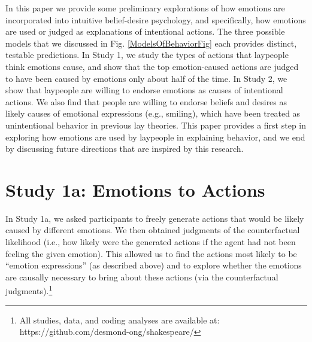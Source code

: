 \documentclass[10pt,letterpaper]{article}
\newcommand{\ndg}[1]{\textcolor{Green}{[ndg: #1]}}
\begin{document}




In this paper we provide some preliminary explorations of how emotions are incorporated into intuitive belief-desire psychology, and specifically, how emotions are used or judged as explanations of intentional actions. The three possible models that we discussed in Fig. \ref{ModelsOfBehaviorFig} each provides distinct, testable predictions. In Study 1, we study the types of actions that laypeople think emotions cause, and show that the top emotion-caused actions are judged to have been caused by emotions only about half of the time. In Study 2, we show that laypeople are willing to endorse emotions as causes of intentional actions. We also find that people are willing to endorse beliefs and desires as likely causes of emotional expressions (e.g., smiling), which have been treated as unintentional behavior in previous lay theories. This paper provides a first step in exploring how emotions are used by laypeople in explaining behavior, and we end by discussing future directions that are inspired by this research.



\section{Study 1a: Emotions to Actions}

	In Study 1a, we asked participants to freely generate actions that would be likely caused by different emotions. 
	We then obtained judgments of the counterfactual likelihood (i.e., how likely were the generated actions if the agent had not been feeling the given emotion). 
	This allowed us to find the actions most likely to be ``emotion expressions'' (as described above) %
and to explore whether the emotions are causally necessary to bring about these actions (via the counterfactual judgments).\footnote{All studies, data, and coding analyses are available at: \\https://github.com/desmond-ong/shakespeare/}
\end{document}
